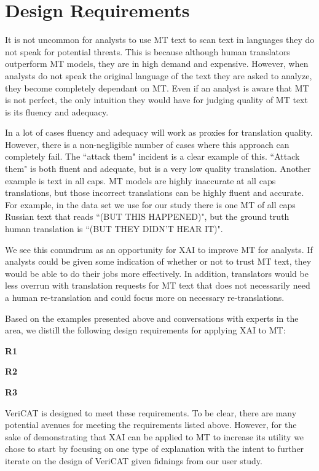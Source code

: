 \section{Design Requirements}

It is not uncommon for analysts to use MT text to scan text in languages they do not speak for potential threats. This is because although human translators outperform MT models, they are in high demand and expensive\cite{mauvcec2019machine}. However, when analysts do not speak the original language of the text they are asked to analyze, they become completely dependant on MT. Even if an analyst is aware that MT is not perfect, the only intuition they would have for judging quality of MT text is its fluency and adequacy. 

In a lot of cases fluency and adequacy will work as proxies for translation quality. However, there is a non-negligible number of cases where this approach can completely fail. The ``attack them" incident is a clear example of this. ``Attack them" is both fluent and adequate, but is a very low quality translation. Another example is text in all caps. MT models are highly inaccurate at all caps translations, but those incorrect translations can be highly fluent and accurate. For example, in the data set we use for our study there is one MT of all caps Russian text that reads ``(BUT THIS HAPPENED)", but the ground truth human translation is ``(BUT THEY DIDN'T HEAR IT)".       

We see this conundrum as an opportunity for XAI to improve MT for analysts. If analysts could be given some indication of whether or not to trust MT text, they would be able to do their jobs more effectively. In addition, translators would be less overrun with translation requests for MT text that does not necessarily need a human re-translation and could focus more on necessary re-translations.

Based on the examples presented above and conversations with experts in the area, we distill the following design requirements for applying XAI to MT: 

\begin{compacthang}
\item \textbf{R1}
\item \textbf{R2}
\item \textbf{R3} 
\end{compacthang}

VeriCAT is designed to meet these requirements. To be clear, there are many potential avenues for meeting the requirements listed above. However, for the sake of demonstrating that XAI can be applied to MT to increase its utility we chose to start by focusing on one type of explanation with the intent to further iterate on the design of VeriCAT given fidnings from our user study.    